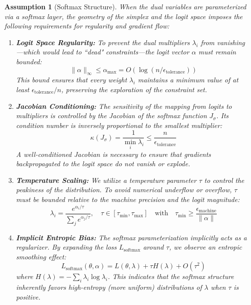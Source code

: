 \documentclass[preprint,12pt,authoryear]{elsarticle}
\newtheorem{assumption}{Assumption}
\begin{document}
\begin{assumption}[Softmax Structure]\label{assump:softmax}
When the dual variables are parameterized via a softmax layer, the geometry of the simplex and the logit space imposes the following requirements for regularity and gradient flow:

\begin{enumerate}
    \item \textbf{Logit Space Regularity:} To prevent the dual multipliers $\lambda_i$ from vanishing—which would lead to ``dead" constraints—the logit vector $\alpha$ must remain bounded:
    \begin{equation}
        \|\alpha\|_\infty \leq \alpha_{\max} = O(\log(n/\epsilon_{\mathrm{tolerance}}))
    \end{equation}
    This bound ensures that every weight $\lambda_i$ maintains a minimum value of at least $\epsilon_{\mathrm{tolerance}}/n$, preserving the exploration of the constraint set.

    \item \textbf{Jacobian Conditioning:} The sensitivity of the mapping from logits to multipliers is controlled by the Jacobian of the softmax function $J_\sigma$. Its condition number is inversely proportional to the smallest multiplier:
    \begin{equation}
        \kappa(J_\sigma) = \frac{1}{\min_i \lambda_i} \leq \frac{n}{\epsilon_{\mathrm{tolerance}}}
    \end{equation}
    A well-conditioned Jacobian is necessary to ensure that gradients backpropagated to the logit space do not vanish or explode.

    \item \textbf{Temperature Scaling:} We utilize a temperature parameter $\tau$ to control the peakiness of the distribution. To avoid numerical underflow or overflow, $\tau$ must be bounded relative to the machine precision and the logit magnitude:
    \begin{equation}
        \lambda_i = \frac{e^{\alpha_i/\tau}}{\sum_j e^{\alpha_j/\tau}}, \quad \tau \in [\tau_{\min}, \tau_{\max}] \quad \text{with} \quad \tau_{\min} \geq \frac{\epsilon_{\mathrm{machine}}}{\|\alpha\|}
    \end{equation}

    \item \textbf{Implicit Entropic Bias:} The softmax parameterization implicitly acts as a regularizer. By expanding the loss $L_{\text{softmax}}$ around $\tau$, we observe an entropic smoothing effect:
    \begin{equation}
        L_{\text{softmax}}(\theta, \alpha) = L(\theta, \lambda) + \tau H(\lambda) + O(\tau^2)
    \end{equation}
    where $H(\lambda) = -\sum_i \lambda_i \log \lambda_i$. This indicates that the softmax structure inherently favors high-entropy (more uniform) distributions of $\lambda$ when $\tau$ is positive.


\end{enumerate}
\end{assumption}
\end{document}
